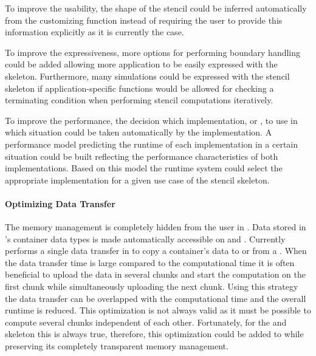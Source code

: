 To improve the usability, the shape of the stencil could be inferred automatically from the customizing function instead of requiring the user to provide this information explicitly as it is currently the case.

To improve the expressiveness, more options for performing boundary handling could be added allowing more application to be easily expressed with the skeleton.
Furthermore, many simulations could be expressed with the stencil skeleton if application-specific functions would be allowed for checking a terminating condition when performing stencil computations iteratively.

To improve the performance, the decision which implementation,  or , to use in which situation could be taken automatically by the \SkelCL implementation.
A performance model predicting the runtime of each implementation in a certain situation could be built reflecting the performance characteristics of both implementations.
Based on this model the runtime system could select the appropriate implementation for a given use case of the stencil skeleton.


\paragraph{Optimizing Data Transfer}
The memory management is completely hidden from the user in \SkelCL.
Data stored in \SkelCL's container data types is made automatically accessible on \CPU and \GPUs.
Currently \SkelCL performs a single data transfer in \OpenCL to copy a container's data to or from a \GPU.
When the data transfer time is large compared to the computational time it is often beneficial to upload the data in several chunks and start the computation on the first chunk while simultaneously uploading the next chunk.
Using this strategy the data transfer can be overlapped with the computational time and the overall runtime is reduced.
This optimization is not always valid as it must be possible to compute several chunks independent of each other.
Fortunately, for the \map and \zip skeleton this is always true, therefore, this optimization could be added to \SkelCL while preserving its completely transparent memory management.


